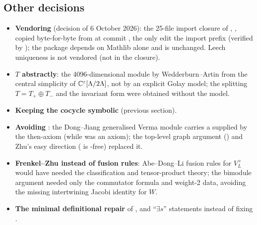 \subsection{Other decisions}
\begin{itemize}
\item \textbf{Vendoring } (decision of 6 October 2026): the 25-file import
  closure of , ,  copied
  byte-for-byte from  at commit
  , the only edit the import prefix (verified by
  ); the package depends on Mathlib alone and  is unchanged. Leech
  uniqueness is not vendored (not in the closure).
\item \textbf{$T$ abstractly}: the 4096-dimensional module by Wedderburn--Artin from the central
  simplicity of ${\mathbb{C}}^\varepsilon[\Lambda/2\Lambda]$, not by an explicit Golay model; the splitting
  $T=T_+\oplus T_-$ and the invariant form were obtained without the model.
\item \textbf{Keeping the cocycle symbolic} (previous section).
\item \textbf{Avoiding }: the Dong--Jiang generalised Verma module carries a
   supplied by the then-axiom (while  was an axiom); the top-level graph argument
  () and Zhu's easy direction ( is -free) replaced it.
\item \textbf{Frenkel--Zhu instead of fusion rules}: Abe--Dong--Li fusion rules for $V_L^+$ would
  have needed the classification and tensor-product theory; the bimodule argument needed only the
  commutator formula and weight-2 data, avoiding the missing intertwining Jacobi identity for $W$.
\item \textbf{The minimal definitional repair} of , and ``$\exists s$'' statements
  instead of fixing .
\end{itemize}

